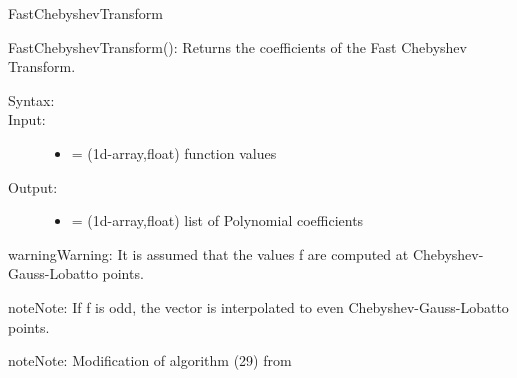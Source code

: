 \documentclass[letterpaper,10pt,english]{sphinxmanual}
\begin{document}
\begin{fulllineitems}
\begin{fulllineitems}
\begin{description}
\end{description}




FastChebyshevTransform



\end{fulllineitems}


\begin{fulllineitems}
\label{index:SpectralToolbox.Spectral1D.Poly1D.FastChebyshevTransform}
FastChebyshevTransform(): Returns the coefficients of the Fast Chebyshev Transform.
\begin{description}
\item[{Syntax:}] \leavevmode
{}

\item[{Input:}] \leavevmode\begin{itemize}
\item {} 
 = (1d-array,float) function values

\end{itemize}

\item[{Output:}] \leavevmode\begin{itemize}
\item {} 
 = (1d-array,float) list of Polynomial coefficients

\end{itemize}

\end{description}

\begin{notice}{warning}{Warning:}
It is assumed that the values f are computed at Chebyshev-Gauss-Lobatto points.
\end{notice}

\begin{notice}{note}{Note:}
If f is odd, the vector is interpolated to even Chebyshev-Gauss-Lobatto points.
\end{notice}

\begin{notice}{note}{Note:}
Modification of algorithm (29) from \footnotemark[1]
\end{notice}

\end{fulllineitems}


\end{fulllineitems}
\end{document}
